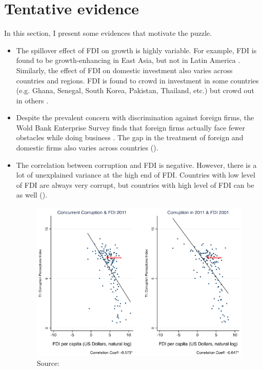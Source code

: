 \documentclass[12pt]{article}
\begin{document}
\section{Tentative evidence}

In this section, I present some evidences that motivate the puzzle.

\begin{itemize}
	\item The spillover effect of FDI on growth is highly variable. For example, FDI is found to be growth-enhancing in East Asia, but not in Latin America \citep{Zhang2001}. Similarly, the effect of FDI on domestic investment also varies across countries and regions. FDI is found to crowd in investment in some countries (e.g. Ghana, Senegal, South Korea, Pakistan, Thailand, etc.) but crowd out in others \citep{Agosin2005}.
	
	\item Despite the prevalent concern with discrimination against foreign firms, the Wold Bank Enterprise Survey finds that foreign firms actually face fewer obstacles while doing business \citep{Batra2003}. The gap in the treatment of foreign and domestic firms also varies across countries ().
	
	\item The correlation between corruption and FDI is negative. However, there is a lot of unexplained variance at the high end of FDI. Countries with low level of FDI are always very corrupt, but countries with high level of FDI can be as well ().
	
	\begin{figure}[!ht]
	\includegraphics[width=\textwidth, height=\textheight,keepaspectratio]{../figure/fdi_corruption}
	\caption{Source: \citep{Malesky2015}}
	\label{fig:fdi_corruption}
	\end{figure}
\end{itemize}
\end{document}
